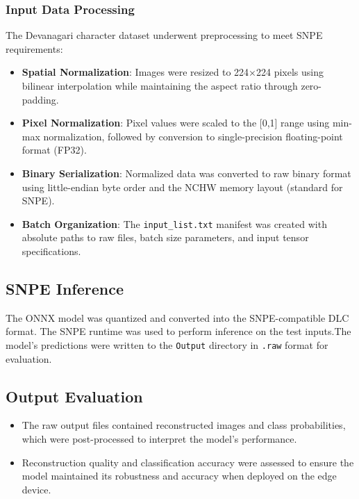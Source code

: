 \documentclass[9pt,a4paper,twoside]{rho-class/rho}
\begin{document}
\subsubsection{Input Data Processing}  
The Devanagari character dataset underwent preprocessing to meet SNPE requirements:  
\begin{itemize}  
\item \textbf{Spatial Normalization}: Images were resized to 224×224 pixels using bilinear interpolation while maintaining the aspect ratio through zero-padding.  
\item \textbf{Pixel Normalization}: Pixel values were scaled to the [0,1] range using min-max normalization, followed by conversion to single-precision floating-point format (FP32).  
\item \textbf{Binary Serialization}: Normalized data was converted to raw binary format using little-endian byte order and the NCHW memory layout (standard for SNPE).  
\item \textbf{Batch Organization}: The \texttt{input\_list.txt} manifest was created with absolute paths to raw files, batch size parameters, and input tensor specifications.  
\end{itemize}  





\subsection{SNPE Inference}
The ONNX model was quantized and converted into the SNPE-compatible DLC format. The SNPE runtime was used to perform inference on the test inputs.The model's predictions were written to the \texttt{Output} directory in \texttt{.raw} format for evaluation.

\subsection{Output Evaluation}
\begin{itemize}
    \item The raw output files contained reconstructed images and class probabilities, which were post-processed to interpret the model's performance.
    \item Reconstruction quality and classification accuracy were assessed to ensure the model maintained its robustness and accuracy when deployed on the edge device.
\end{itemize}
\end{document}
